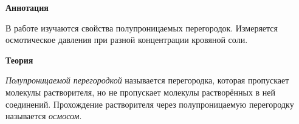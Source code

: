 \textbf{\Large Аннотация}

В работе изучаются свойства полупроницаемых перегородок. Измеряется осмотическое давления при разной концентрации кровяной соли. 

\textbf{\Large Теория}

\textit{Полупроницаемой перегородкой} называется перегородка, которая пропускает молекулы растворителя, но не пропускает молекулы растворённых в ней соединений. Прохождение растворителя через полупроницаемую перегородку называется \textit{осмосом}.

